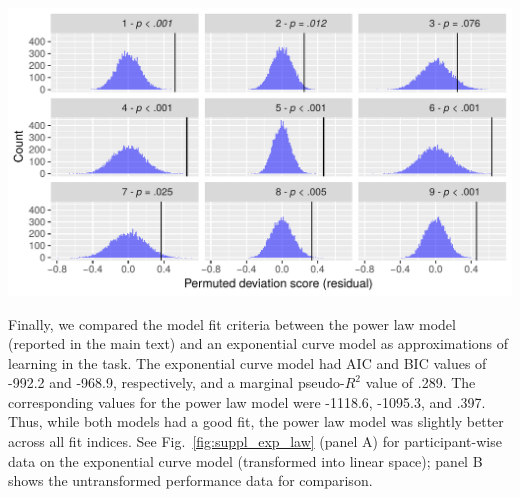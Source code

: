 \documentclass{article}
\begin{document}
\begin{minipage}{\textwidth}
\centering
\includegraphics[width=\linewidth]{suppl5_permute_cogcar}
\label{fig:suppl_permute_cogcar}
\end{minipage}

Finally, we compared the model fit criteria between the power law model (reported in the main text) and an exponential curve model as approximations of learning in the task. The exponential curve model had AIC and BIC values of -992.2 and -968.9, respectively, and a marginal pseudo-$R^2$ value of .289. The corresponding values for the power law model were -1118.6, -1095.3, and .397. Thus, while both models had a good fit, the power law model was slightly better across all fit indices. See Fig.~\ref{fig:suppl_exp_law} (panel A) for participant-wise data on the exponential curve model (transformed into linear space); panel B shows the untransformed performance data for comparison.
\end{document}
